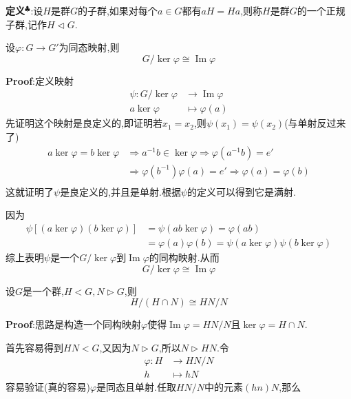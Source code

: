 \textbf{定义}$^\clubsuit $:设$H$是群$G$的子群,如果对每个$a\in G$都有$aH=Ha$,则称$H$是群$G$的一个正规子群,记作$H\lhd G$.\par
\begin{tcolorbox}[colback=KuangNei,colframe=BianKuang,title=\textbf{群同态基本定理},sharpish corners]
    设$\varphi :G\to G'$为同态映射,则
    $$
    G/\ker \varphi\cong \operatorname{Im}\varphi
    $$
\end{tcolorbox}
\textbf{Proof}:定义映射
$$
\begin{aligned}
    \psi :G/\ker \varphi&\to \operatorname{Im}\varphi\\
          a\ker \varphi&\mapsto \varphi (a)
\end{aligned}
$$
先证明这个映射是良定义的,即证明若$x_1=x_2$,则$\psi(x_1)=\psi(x_2)$(与单射反过来了)
$$
\begin{aligned}
    a\ker \varphi=b\ker \varphi &\Rightarrow a^{-1}b\in \ker \varphi\Rightarrow \varphi(a^{-1}b)=e'\\
                                &\Rightarrow \varphi(b^{-1})\varphi(a)=e'\Rightarrow \varphi(a)=\varphi(b)\\
\end{aligned}
$$
这就证明了$\psi$是良定义的,并且是单射.根据$\psi$的定义可以得到它是满射.\par
因为
$$
\begin{aligned}
    \psi[(a\ker \varphi)(b\ker \varphi)] &= \psi(ab\ker \varphi)=\varphi(ab)\\
                                        &=\varphi(a)\varphi(b)=\psi(a\ker \varphi)\psi(b\ker \varphi)
\end{aligned}
$$
综上表明$\psi$是一个$G/\ker\varphi$到$\operatorname{Im}\varphi$的同构映射.从而
$$
G/\ker \varphi\cong \operatorname{Im}\varphi
$$
\begin{tcolorbox}[colback=KuangNei,colframe=BianKuang,title=\textbf{第一群同构定理},sharpish corners]
    设$G$是一个群,$H<G,N\triangleright G$,则
    $$
    H/(H\cap N)\cong HN/N
    $$
\end{tcolorbox}
\textbf{Proof}:思路是构造一个同构映射$\varphi$使得$\operatorname{Im}\varphi=HN/N$且$\ker\varphi =H\cap N$.\par
首先容易得到$HN<G$,又因为$N\triangleright G$,所以$N\triangleright HN$.令
$$
\begin{aligned}
    \varphi:H &\to HN/N\\
            h &\mapsto hN
\end{aligned}
$$
容易验证(真的容易)$\varphi$是同态且单射.任取$HN/N$中的元素$(hn)N$,那么
